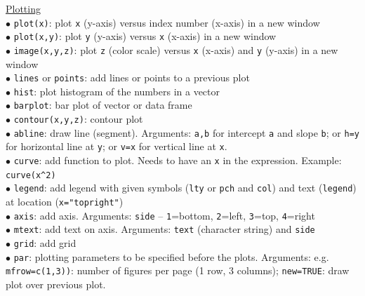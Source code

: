 \documentclass[a4paper,11pt,twocolumn,tablecaptionabove]{scrartcl} %
\begin{document}
\noindent \underline{Plotting}\\
$\bullet$ \texttt{plot(x)}: plot \texttt{x} (y-axis) versus index number (x-axis) in a new window\\
$\bullet$ \texttt{plot(x,y)}: plot \texttt{y} (y-axis) versus \texttt{x} (x-axis) in a new window\\
$\bullet$ \texttt{image(x,y,z)}: plot \texttt{z} (color scale) versus \texttt{x} (x-axis) and \texttt{y} (y-axis) in a new window\\
$\bullet$ \texttt{lines} or \texttt{points}: add lines or points to a previous plot \\
$\bullet$ \texttt{hist}: plot histogram of the numbers in a vector\\
$\bullet$ \texttt{barplot}: bar plot of vector or data frame\\
$\bullet$ \texttt{contour(x,y,z)}: contour plot\\
$\bullet$ \texttt{abline}: draw line (segment). Arguments: \texttt{a,b} for intercept \texttt{a} and slope \texttt{b}; or \texttt{h=y} for horizontal line at \texttt{y}; or \texttt{v=x} for vertical line at \texttt{x}. \\
$\bullet$ \texttt{curve}: add function to plot. Needs to have an \texttt{x} in the expression. Example: \verb!curve(x^2)! \\
$\bullet$ \texttt{legend}: add legend with given symbols (\texttt{lty} or \texttt{pch} and \texttt{col}) and text (\texttt{legend}) at location (\texttt{x="topright"})\\
$\bullet$ \texttt{axis}: add axis. Arguments: \texttt{side} -- \texttt{1}=bottom, \texttt{2}=left, \texttt{3}=top, \texttt{4}=right\\
$\bullet$ \texttt{mtext}: add text on axis. Arguments: \texttt{text} (character string) and \texttt{side}\\
$\bullet$ \texttt{grid}: add grid\\
$\bullet$ \texttt{par}: plotting parameters to be specified before the plots.  Arguments: e.g. \texttt{mfrow=c(1,3))}: number of figures per page (1 row, 3 columns); \texttt{new=TRUE}: draw plot over previous plot.\\
\end{document}
